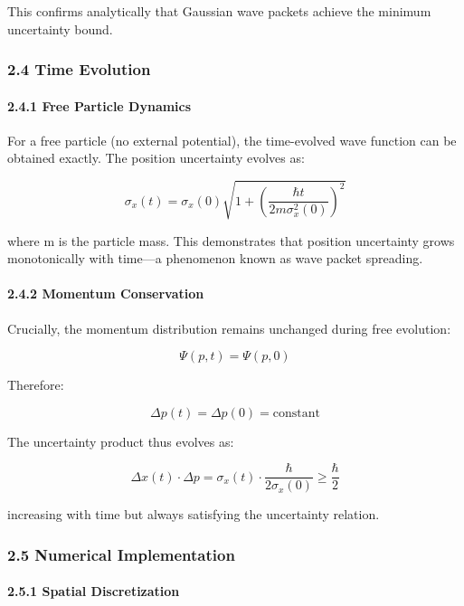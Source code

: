 \documentclass[
  11pt,
]{article}
\begin{document}
This confirms analytically that Gaussian wave packets achieve the
minimum uncertainty bound.

\subsubsection{2.4 Time Evolution}\label{time-evolution}

\paragraph{2.4.1 Free Particle Dynamics}\label{free-particle-dynamics}

For a free particle (no external potential), the time-evolved wave
function can be obtained exactly. The position uncertainty evolves as:

\[\sigma_x(t) = \sigma_x(0)\sqrt{1 + \left(\frac{\hbar t}{2m\sigma_x^2(0)}\right)^2}\]

where m is the particle mass. This demonstrates that position
uncertainty grows monotonically with time---a phenomenon known as wave
packet spreading.

\paragraph{2.4.2 Momentum Conservation}\label{momentum-conservation}

Crucially, the momentum distribution remains unchanged during free
evolution:

\[\Psi(p,t) = \Psi(p,0)\]

Therefore:

\[\Delta p(t) = \Delta p(0) = \text{constant}\]

The uncertainty product thus evolves as:

\[\Delta x(t) \cdot \Delta p = \sigma_x(t) \cdot \frac{\hbar}{2\sigma_x(0)} \geq \frac{\hbar}{2}\]

increasing with time but always satisfying the uncertainty relation.

\subsubsection{2.5 Numerical
Implementation}\label{numerical-implementation}

\paragraph{2.5.1 Spatial Discretization}\label{spatial-discretization}
\end{document}
